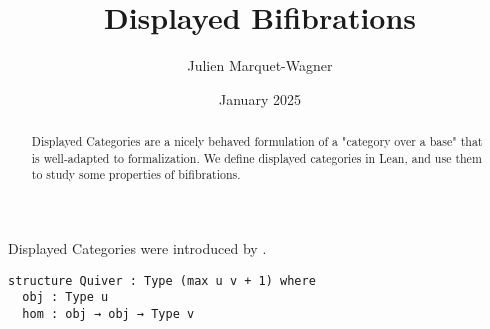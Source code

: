 \documentclass{article}
\begin{document}
\title{Displayed Bifibrations}
\author{Julien Marquet-Wagner}
\date{January 2025}

\maketitle

\begin{abstract}
  Displayed Categories are a nicely behaved formulation of a "category over a
  base" that is well-adapted to formalization. We define displayed categories
  in Lean, and use them to study some properties of bifibrations.
\end{abstract}

Displayed Categories were introduced by \citet{dispcats}.

\begin{lstlisting}
structure Quiver : Type (max u v + 1) where
  obj : Type u
  hom : obj → obj → Type v
\end{lstlisting}


\end{document}
